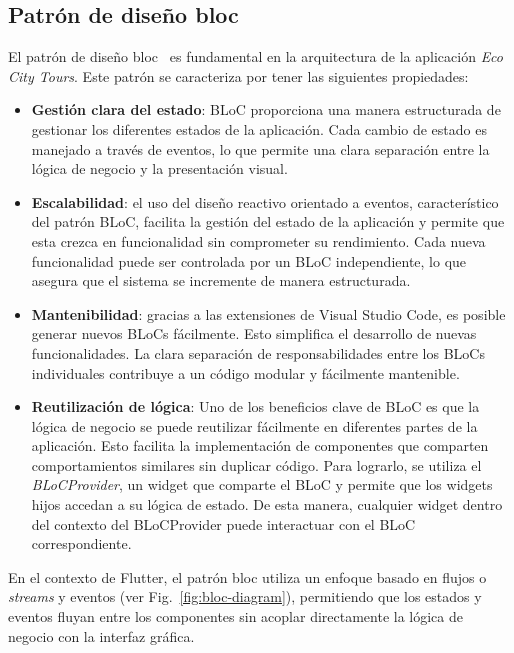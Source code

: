 \subsection{Patrón de diseño \acrfull{bloc}}
El patrón de diseño \acrshort{bloc}~\cite{flutter_bloc} es fundamental en la arquitectura de la aplicación \textit{Eco City Tours}. Este patrón se caracteriza por tener las siguientes propiedades:
\begin{itemize}

	\item \textbf{Gestión clara del estado}: BLoC proporciona una manera estructurada de gestionar los diferentes estados de la aplicación. Cada cambio de estado es manejado a través de eventos, lo que permite una clara separación entre la lógica de negocio y la presentación visual.

	\item \textbf{Escalabilidad}: el uso del diseño reactivo orientado a eventos, característico del patrón BLoC, facilita la gestión del estado de la aplicación y permite que esta crezca en funcionalidad sin comprometer su rendimiento. Cada nueva funcionalidad puede ser controlada por un BLoC independiente, lo que asegura que el sistema se incremente de manera estructurada.

	\item \textbf{Mantenibilidad}: gracias a las extensiones de Visual Studio Code, es posible generar nuevos BLoCs fácilmente. Esto simplifica el desarrollo de nuevas funcionalidades. La clara separación de responsabilidades entre los BLoCs individuales contribuye a un código modular y fácilmente mantenible.

	\item \textbf{Reutilización de lógica}: Uno de los beneficios clave de BLoC es que la lógica de negocio se puede reutilizar fácilmente en diferentes partes de la aplicación. Esto facilita la implementación de componentes que comparten comportamientos similares sin duplicar código. Para lograrlo, se utiliza el \textit{BLoCProvider}, un widget que comparte el BLoC y permite que los widgets hijos accedan a su lógica de estado. De esta manera, cualquier widget dentro del contexto del BLoCProvider puede interactuar con el BLoC correspondiente.

\end{itemize}

En el contexto de Flutter, el patrón \acrlong{bloc} utiliza un enfoque basado en flujos o \textit{streams} y eventos (ver Fig.~\ref{fig:bloc-diagram}), permitiendo que los estados y eventos fluyan entre los componentes sin acoplar directamente la lógica de negocio con la interfaz gráfica. 

